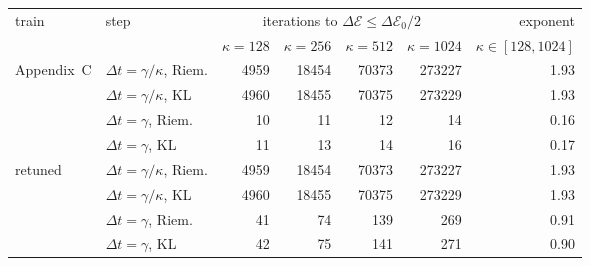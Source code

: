 \begin{tabular}{ll rrrr r}
\toprule
train & step & \multicolumn{4}{c}{iterations to $\Delta\mathcal{E}\leq\Delta\mathcal{E}_0/2$} & exponent \\
\cmidrule(lr){3-6}\cmidrule(lr){7-7}
 & & $\kappa{=}128$ & $\kappa{=}256$ & $\kappa{=}512$ & $\kappa{=}1024$ & $\kappa\in[128,1024]$ \\
\midrule
Appendix~C & $\Delta t=\gamma/\kappa$, Riem. & 4959 & 18454 & 70373 & 273227 & 1.93 \\
 & $\Delta t=\gamma/\kappa$, KL & 4960 & 18455 & 70375 & 273229 & 1.93 \\
 & $\Delta t=\gamma$, Riem. & 10 & 11 & 12 & 14 & 0.16 \\
 & $\Delta t=\gamma$, KL & 11 & 13 & 14 & 16 & 0.17 \\
\midrule
retuned & $\Delta t=\gamma/\kappa$, Riem. & 4959 & 18454 & 70373 & 273227 & 1.93 \\
 & $\Delta t=\gamma/\kappa$, KL & 4960 & 18455 & 70375 & 273229 & 1.93 \\
 & $\Delta t=\gamma$, Riem. & 41 & 74 & 139 & 269 & 0.91 \\
 & $\Delta t=\gamma$, KL & 42 & 75 & 141 & 271 & 0.90 \\
\bottomrule
\end{tabular}
